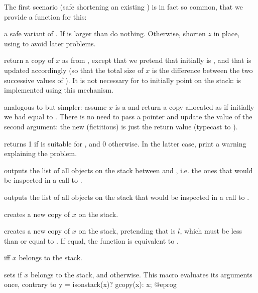 The first scenario (safe shortening an existing ) is in fact so
common, that we provide a function for this:

 a safe variant of . If
 is larger than  do nothing. Otherwise, shorten $z$ in
place, using  to avoid later  problems.

 return a copy of $x$ as from
, except that we pretend that initially  is ,
and that  is updated accordingly (so that the total size of $x$ is
the difference between the two successive values of ). It is not
necessary for  to initially point on the stack:  is
implemented using this mechanism.

 analogous to  but
simpler: assume $x$ is a  and return a copy allocated as if
initially we had  equal to . There is no need to pass a
pointer and update the value of the second argument: the new (fictitious)
 is just the return value (typecast to ).


 returns 1 if  is suitable for
, and 0 otherwise. In the latter case, print a warning
explaining the problem.

 outputs the list of all objects on the
stack between  and , i.e. the ones that would be inspected
in a call to .

 outputs the list of all objects on the
stack that would be inspected in a call to .


 creates a new copy of $x$ on the stack.

 creates a new copy of $x$
on the stack, pretending that  is $l$, which must be less than or
equal to . If equal, the function is equivalent to .

  iff $x$ belongs to the stack.

 sets  if
$x$ belongs to the stack, and  otherwise. This macro evaluates
its arguments once, contrary to
\bprog
  y = isonstack(x)? gcopy(x): x;
@eprog

